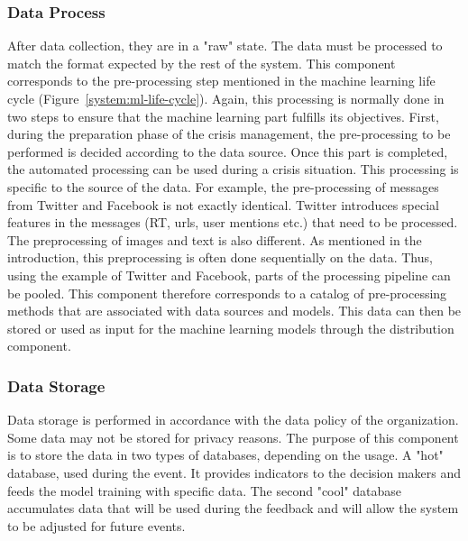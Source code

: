\subsubsection{Data Process}
After data collection, they are in a "raw" state.
The data must be processed to match the format expected by the rest of the system.
This component corresponds to the pre-processing step mentioned in the machine learning life cycle (Figure~\ref{system:ml-life-cycle}).
Again, this processing is normally done in two steps to ensure that the machine learning part fulfills its objectives.
First, during the preparation phase of the crisis management, the pre-processing to be performed is decided according to the data source.
Once this part is completed, the automated processing can be used during a crisis situation.
This processing is specific to the source of the data.
For example, the pre-processing of messages from Twitter and Facebook is not exactly identical.
Twitter introduces special features in the messages (RT, urls, user mentions etc.) that need to be processed.
The preprocessing of images and text is also different.
As mentioned in the introduction, this preprocessing is often done sequentially on the data.
Thus, using the example of Twitter and Facebook, parts of the processing pipeline can be pooled.
This component therefore corresponds to a catalog of pre-processing methods that are associated with data sources and models.
This data can then be stored or used as input for the machine learning models through the distribution component.

\subsubsection{Data Storage}
Data storage is performed in accordance with the data policy of the organization.
Some data may not be stored for privacy reasons.
The purpose of this component is to store the data in two types of databases, depending on the usage.
A "hot" database, used during the event.
It provides indicators to the decision makers and feeds the model training with specific data.
The second "cool" database accumulates data that will be used during the feedback and will allow the system to be adjusted for future events.

